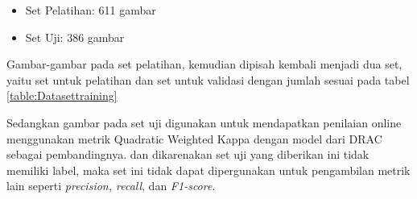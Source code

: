 	\begin{itemize}
		\item Set Pelatihan: 611 gambar
		\item Set Uji: 386 gambar
	\end{itemize}
Gambar-gambar pada set pelatihan, kemudian dipisah kembali menjadi dua set, yaitu set untuk pelatihan dan set untuk validasi dengan jumlah sesuai pada tabel \ref{table:Datasettraining}


Sedangkan gambar pada set uji digunakan untuk mendapatkan penilaian online menggunakan metrik Quadratic Weighted Kappa dengan model dari DRAC sebagai pembandingnya. dan dikarenakan set uji yang diberikan ini tidak memiliki label, maka set ini tidak dapat dipergunakan untuk pengambilan metrik lain seperti \emph{precision, recall}, dan \emph{F1-score}.

